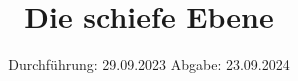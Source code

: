
\usepackage{tikz}

\subject{V16516}
\title{Die schiefe Ebene}
\date{%
  Durchführung: 29.09.2023
  \hspace{3em}
  Abgabe: 23.09.2024
}



\maketitle
\thispagestyle{empty}
\tableofcontents
\newpage






\printbibliography{}


